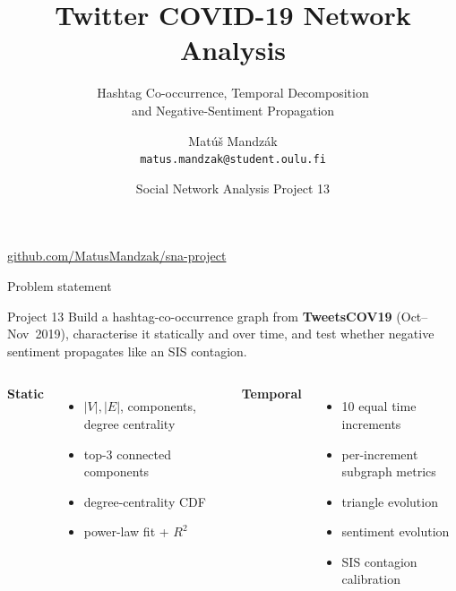 \documentclass[aspectratio=169,10pt]{beamer}
\title[SNA Project 13]{Twitter COVID-19 Network Analysis}
\subtitle{Hashtag Co-occurrence, Temporal Decomposition\\
and Negative-Sentiment Propagation}
\author[M. Mandz\'{a}k]{Mat\'{u}\v{s} Mandz\'{a}k\\
\texttt{matus.mandzak@student.oulu.fi}}
\institute[Oulu]{Group 13 \textendash{} Faculty of ITEE, University of Oulu}
\date{Social Network Analysis \textendash{} Project 13}
\begin{document}
\begin{frame}
  \titlepage
  \begin{center}
    \footnotesize\href{https://github.com/MatusMandzak/sna-project}%
      {github.com/MatusMandzak/sna-project}
  \end{center}
\end{frame}

\begin{frame}{Problem statement}
  \begin{block}{Project 13}
    Build a hashtag-co-occurrence graph from
    \textbf{TweetsCOV19} (Oct--Nov~2019), characterise it
    statically and over time, and test whether negative
    sentiment propagates like an SIS contagion.
  \end{block}
  \vfill
  \begin{columns}[T,onlytextwidth]
    \textbf{Static}
    \begin{itemize}\itemsep2pt
      \item \(|V|, |E|\), components, degree centrality
      \item top-3 connected components
      \item degree-centrality CDF
      \item power-law fit + \(R^{2}\)
    \end{itemize}
    \textbf{Temporal}
    \begin{itemize}\itemsep2pt
      \item 10 equal time increments
      \item per-increment subgraph metrics
      \item triangle evolution
      \item sentiment evolution
      \item SIS contagion calibration
    \end{itemize}
  \end{columns}
\end{frame}
\end{document}
